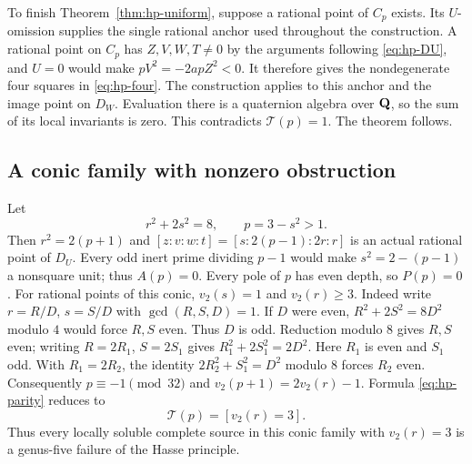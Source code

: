 To finish Theorem~\ref{thm:hp-uniform}, suppose a rational point of
$C_p$ exists.  Its $U$-omission supplies the single rational anchor
used throughout the construction.  A rational point on $C_p$ has
$Z,V,W,T\ne0$ by the arguments following \eqref{eq:hp-DU}, and
$U=0$ would make $pV^2=-2apZ^2<0$.  It therefore gives the
nondegenerate four squares in \eqref{eq:hp-four}.
The construction applies to this anchor and the image point on $D_W$.
Evaluation there is a quaternion algebra over $\mathbf Q$, so the sum of its
local invariants is zero.  This contradicts
$\mathcal T(p)=1$.  The theorem follows.

\subsection{A conic family with nonzero obstruction}

Let
\begin{equation}\label{eq:hp-conic}
 r^2+2s^2=8,\qquad p=3-s^2>1.
\end{equation}
Then $r^2=2(p+1)$ and
$[z:v:w:t]=[s:2(p-1):2r:r]$ is an actual rational point of $D_U$.
Every odd inert prime dividing $p-1$ would make
$s^2=2-(p-1)$ a nonsquare unit; thus $A(p)=0$.
Every pole of $p$ has even depth, so $P(p)=0$.
For rational points of this conic, $v_2(s)=1$ and $v_2(r)\ge3$.
Indeed write $r=R/D$, $s=S/D$ with $\gcd(R,S,D)=1$.
If $D$ were even, $R^2+2S^2=8D^2$ modulo $4$ would force $R,S$
even.  Thus $D$ is odd.  Reduction modulo $8$ gives $R,S$ even;
writing $R=2R_1$, $S=2S_1$ gives $R_1^2+2S_1^2=2D^2$.
Here $R_1$ is even and $S_1$ odd.  With $R_1=2R_2$, the identity
$2R_2^2+S_1^2=D^2$ modulo $8$ forces $R_2$ even.
Consequently $p\equiv-1\pmod {32}$ and
$v_2(p+1)=2v_2(r)-1$.
Formula \eqref{eq:hp-parity} reduces to
\begin{equation}\label{eq:hp-thinbit}
 \mathcal T(p)=[v_2(r)=3].
\end{equation}
Thus every locally soluble complete source in this conic family with
$v_2(r)=3$ is a genus-five failure of the Hasse principle.

